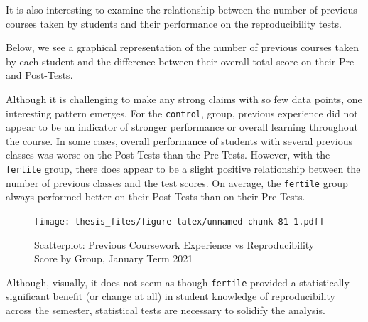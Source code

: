 \documentclass[12pt,twoside]{reedthesis}
\begin{document}
It is also interesting to examine the relationship between the number of previous courses taken by students and their performance on the reproducibility tests.

Below, we see a graphical representation of the number of previous courses taken by each student and the difference between their overall total score on their Pre- and Post-Tests.

Although it is challenging to make any strong claims with so few data points, one interesting pattern emerges. For the \texttt{control}, group, previous experience did not appear to be an indicator of stronger performance or overall learning throughout the course. In some cases, overall performance of students with several previous classes was worse on the Post-Tests than the Pre-Tests. However, with the \texttt{fertile} group, there does appear to be a slight positive relationship between the number of previous classes and the test scores. On average, the \texttt{fertile} group always performed better on their Post-Tests than on their Pre-Tests.
\begin{figure}
\centering
\texttt{[image: thesis\_files/figure-latex/unnamed-chunk-81-1.pdf]}
\caption{\label{fig:unnamed-chunk-81}Scatterplot: Previous Coursework Experience vs Reproducibility Score by Group, January Term 2021}
\end{figure}
Although, visually, it does not seem as though \texttt{fertile} provided a statistically significant benefit (or change at all) in student knowledge of reproducibility across the semester, statistical tests are necessary to solidify the analysis.
\end{document}
